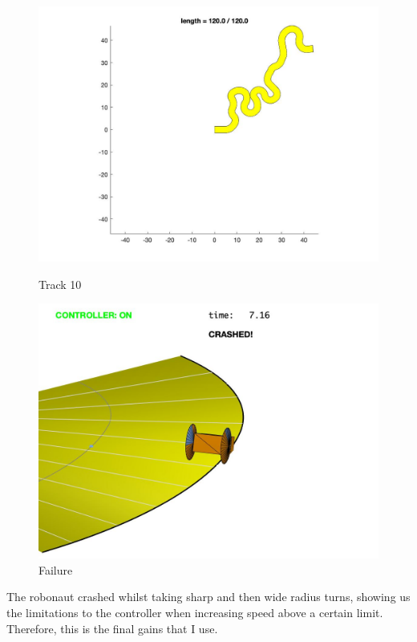 \documentclass{article}
\begin{document}
\begin{figure}[H]
\centering
\begin{minipage}{.5\textwidth}
	\centering
	\includegraphics[width=.8\linewidth]{failure.jpg}
	\caption{Track 10}
	\end{minipage}%
\begin{minipage}{.5\textwidth}
	\centering
	\includegraphics[width=.8\linewidth]{failurer.jpg}
	\caption{Failure}
\end{minipage}
\end{figure}
The robonaut crashed whilst taking sharp and then wide radius turns, showing us the limitations to the controller when increasing speed above a certain limit. Therefore, this is the final gains that I use.
\end{document}
